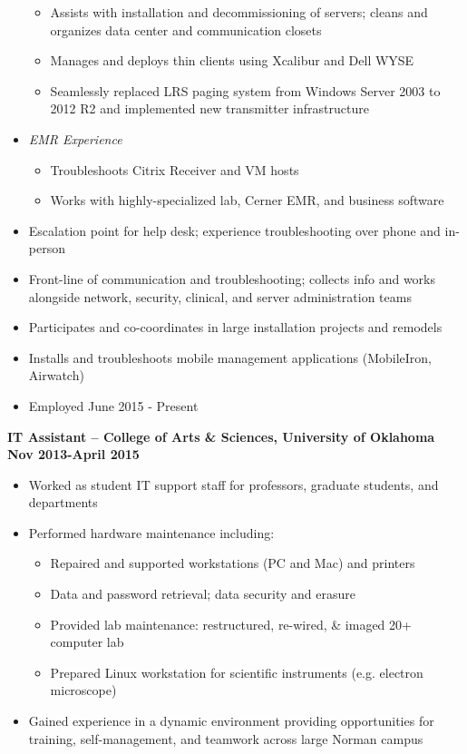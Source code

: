 \documentclass[centered]{res}
\begin{document}
\begin{resume}
\begin{itemize}
			\begin{itemize}
			\item Assists with installation and decommissioning of servers; cleans and organizes data center and communication closets
			\item Manages and deploys thin clients using Xcalibur and Dell WYSE
			\item Seamlessly replaced LRS paging system from Windows Server 2003 to 2012 R2 and implemented new transmitter infrastructure
		\end{itemize}
	\item \textsl{EMR Experience}
		\begin{itemize}
			\item Troubleshoots Citrix Receiver and VM hosts
			\item Works with highly-specialized lab, Cerner EMR, and business software
		\end{itemize}
	\item Escalation point for help desk; experience troubleshooting over phone and in-person
	\item Front-line of communication and troubleshooting; collects info and works alongside network, security, clinical, and server administration teams
	\item Participates and co-coordinates in large installation projects and remodels
	\item Installs and troubleshoots mobile management applications (MobileIron, Airwatch)
	\item{Employed June 2015 - Present}
\end{itemize}
\textbf{IT Assistant -- College of Arts \& Sciences, University of Oklahoma}
\newline
\textbf{Nov 2013-April 2015}
\begin{itemize}
	\item Worked as student IT support staff for professors, graduate students, and departments
	\item Performed hardware maintenance including:
		\begin{itemize}
			\item Repaired and supported workstations (PC and Mac) and printers
			\item Data and password retrieval; data security and erasure
			\item Provided lab maintenance: restructured, re-wired, \& imaged 20+ computer lab 
			\item Prepared Linux workstation for scientific instruments (e.g. electron microscope)
		\end{itemize}
	\item Gained experience in a dynamic environment providing opportunities for training, self-management, and teamwork across large Norman campus
\end{itemize}


\end{resume}
\end{document}
